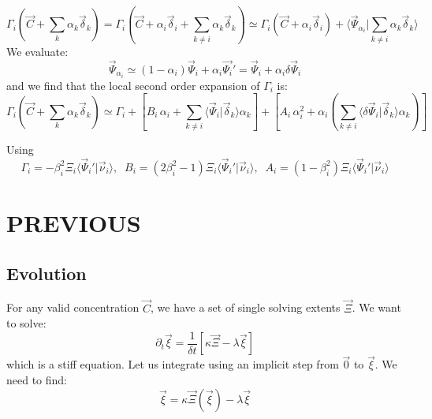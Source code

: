 \documentclass[aps,12pt]{revtex4}
\begin{document}
\begin{equation}
	\Gamma_i(\vec{C} + \sum_k \alpha_k \vec{\delta}_k ) 
	=
	\Gamma_i \left(\vec{C} + \alpha_i \vec{\delta}_i + \sum_{k\not=i} \alpha_k \vec{\delta}_k \right)
	\simeq
	\Gamma_i(\vec{C}+\alpha_i \vec{\delta}_i) + \langle \vec{\Psi}_{\alpha_i} \vert \sum_{k\not=i} \alpha_k \vec{\delta}_k \rangle
\end{equation}
We evaluate:
\begin{equation}
	\vec{\Psi}_{\alpha_i} \simeq (1-\alpha_i) \vec{\Psi}_i + \alpha_i \vec{\Psi_i}' = \vec{\Psi}_i + \alpha_i \delta\vec{\Psi}_i
\end{equation}
and we find that the local second order expansion of $\Gamma_i$ is:
\begin{equation}
	\Gamma_i(\vec{C} + \sum_k \alpha_k \vec{\delta}_k ) 
	\simeq
	\Gamma_i +
	\left[ 
	 B_i \, \alpha_i + \sum_{k\not=i} \langle \vec{\Psi}_i \vert \vec{\delta}_k \rangle \alpha_k
	\right]
	+ \left[ A_i \, \alpha_i^2 + \alpha_i \left( \sum_{k\not=i} \langle \delta\vec{\Psi}_i \vert \vec{\delta}_k \rangle \alpha_k \right) \right]
\end{equation}

Using 
\begin{equation}
	\Gamma_i = -\beta_i^2 \Xi_i \langle \vec{\Psi}_i' \vert \vec{\nu}_i \rangle,
	\;\;B_i = (2\beta_i^2-1) \Xi_i \langle \vec{\Psi}_i' \vert \vec{\nu}_i \rangle,
	\;\;A_i = (1-\beta_i^2) \Xi_i \langle \vec{\Psi}_i' \vert \vec{\nu}_i \rangle
\end{equation}



\section{PREVIOUS}

\subsection{Evolution}

For any valid concentration $\vec{C}$, we have a set of single solving extents $\vec{\Xi}$.
We want to solve:
\begin{equation}
	\partial_t \vec{\xi} = \dfrac{1}{\delta t} \left[ \kappa \vec{\Xi} - \lambda \vec{\xi} \right]
\end{equation}
which is a stiff equation. Let us integrate using an implicit step from $\vec{0}$ to $\vec{\xi}$.
We need to find:
\begin{equation}
	\vec{\xi} = \kappa \vec{\Xi}(\vec{\xi}) - \lambda \vec{\xi}
\end{equation}
\end{document}
